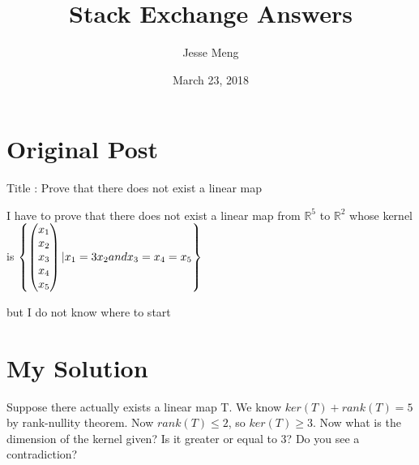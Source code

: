 \documentclass{article}
\title{Stack Exchange Answers}
\author{Jesse Meng }
\date{March 23, 2018}
\begin{document}
\maketitle

\section{Original Post}
Title : Prove that there does not exist a linear map

I have to prove that there does not exist a linear map from $\mathbb{R}^5$ to $\mathbb{R}^2$ whose kernel is $\left\{\left(\begin{matrix} x_1 \\ x_2 \\ x_3 \\ x_4 \\ x_5 \end{matrix}\right) | x_1 = 3x_2 \space and \space x_3 = x_4 = x_5 \right\}$

but I do not know where to start
\section{My Solution}
Suppose there actually exists a linear map T. We know $ker(T)+rank(T)=5$ by rank-nullity theorem. Now $rank(T)\leq2$, so $ker(T) \geq 3$. Now what is the dimension of the kernel given? Is it greater or equal to 3? Do you see a contradiction?
\end{document}
